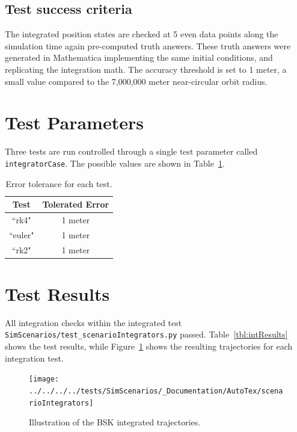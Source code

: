\subsection{Test success criteria}
The integrated position states are checked at 5 even data points along the simulation time again pre-computed truth answers.  These truth answers were generated in Mathematica implementing the same initial conditions, and replicating the integration math.    The accuracy threshold is set to 1 meter, a small value compared to the 7,000,000 meter near-circular orbit radius.  



\section{Test Parameters}
Three tests are run controlled through a single test parameter called {\tt integratorCase}.  The possible values are shown in Table~\ref{tbl:intCases}.  

\begin{table}[htbp]
	\caption{Error tolerance for each test.}
	\label{tbl:intCases}
	\centering \fontsize{10}{10}\selectfont
	\begin{tabular}{ c | c } %
		\hline\hline
		\textbf{Test}   	      	               & \textbf{Tolerated Error} 						           \\ \hline
		``rk4"                           & 1 meter	  \\ 
		``euler"                           & 1 meter	  \\ 
		``rk2"                           & 1 meter	  \\ 
		\hline\hline
	\end{tabular}
\end{table}

\section{Test Results}
All integration checks within the integrated test {\tt SimScenarios/test\_scenarioIntegrators.py} passed.  Table~\ref{tbl:intResults} shows the test results, while Figure~\ref{fig:intResultsPython} shows the resulting trajectories for each integration test.

\begin{figure}[t]
	\centerline{
		\texttt{[image: ../../../../tests/SimScenarios/\_Documentation/AutoTex/scenarioIntegrators]}
	}
	\caption{Illustration of the BSK integrated trajectories.}
	\label{fig:intResultsPython}
\end{figure}


